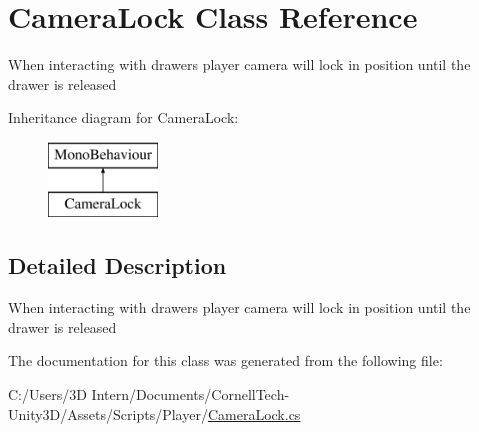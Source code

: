 \hypertarget{class_camera_lock}{}\section{Camera\+Lock Class Reference}
\label{class_camera_lock}


When interacting with drawers player camera will lock in position until the drawer is released  


Inheritance diagram for Camera\+Lock\+:\begin{figure}[H]
\begin{center}
\leavevmode
\includegraphics[height=2.000000cm]{class_camera_lock}
\end{center}
\end{figure}


\subsection{Detailed Description}
When interacting with drawers player camera will lock in position until the drawer is released 



The documentation for this class was generated from the following file\+:\begin{DoxyCompactItemize}
\item 
C\+:/\+Users/3\+D Intern/\+Documents/\+Cornell\+Tech-\/\+Unity3\+D/\+Assets/\+Scripts/\+Player/\hyperlink{_camera_lock_8cs}{Camera\+Lock.\+cs}\end{DoxyCompactItemize}
